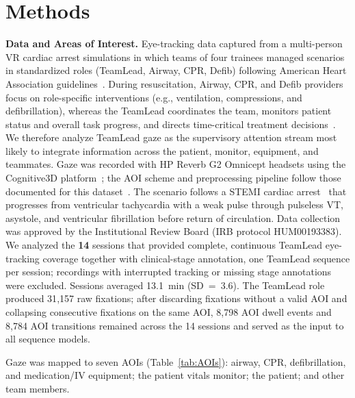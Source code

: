 \documentclass[runningheads]{llncs}
\begin{document}
\section{Methods}
\textbf{Data and Areas of Interest.} Eye-tracking data captured from a multi-person VR cardiac arrest simulations in which teams of four trainees managed scenarios in standardized roles (TeamLead, Airway, CPR, Defib) following American Heart Association guidelines~\cite{perman20242023}. During resuscitation, Airway, CPR, and Defib providers focus on role-specific interventions (e.g., ventilation, compressions, and defibrillation), whereas the TeamLead coordinates the team, monitors patient status and overall task progress, and directs time-critical treatment decisions~\cite{nallamothu2018resuscitation,kolbe2013co}. We therefore analyze TeamLead gaze as the supervisory attention stream most likely to integrate information across the patient, monitor, equipment, and teammates. Gaze was recorded with HP Reverb G2 Omnicept headsets using the Cognitive3D platform~\cite{Cognitive3D}; the AOI scheme and preprocessing pipeline follow those documented for this dataset~\cite{gao2026towards}. The scenario follows a STEMI cardiac arrest~\cite{thygesen2018fourth} that progresses from ventricular tachycardia with a weak pulse through pulseless VT, asystole, and ventricular fibrillation before return of circulation. Data collection was approved by the Institutional Review Board (IRB protocol HUM00193383). We analyzed the \textbf{14} sessions that provided complete, continuous TeamLead eye-tracking coverage together with clinical-stage annotation, one TeamLead sequence per session; recordings with interrupted tracking or missing stage annotations were excluded. Sessions averaged 13.1~min (SD~=~3.6). The TeamLead role produced 31{,}157 raw fixations; after discarding fixations without a valid AOI and collapsing consecutive fixations on the same AOI, 8{,}798 AOI dwell events and 8{,}784 AOI transitions remained across the 14 sessions and served as the input to all sequence models.

Gaze was mapped to seven AOIs (Table~\ref{tab:AOIs}): airway, CPR, defibrillation, and medication/IV equipment; the patient vitals monitor; the patient; and other team members.
\end{document}
